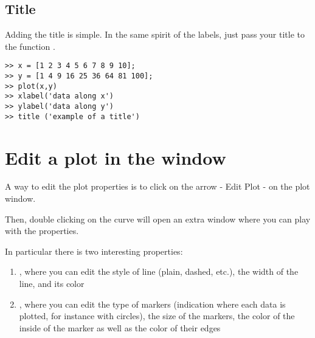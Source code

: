 
\subsection{Title}


Adding the title is simple.
In the same spirit of the labels, just pass your title to the function .

\begin{lstlisting}
>> x = [1 2 3 4 5 6 7 8 9 10];
>> y = [1 4 9 16 25 36 64 81 100];
>> plot(x,y)
>> xlabel('data along x')
>> ylabel('data along y')
>> title ('example of a title')
\end{lstlisting}





\section{Edit a plot in the window}

A way to edit the plot properties is to click on the arrow - Edit Plot - on the plot window.

Then, double clicking on the curve will open an extra window where you can play with the properties.

In particular there is two interesting properties:
\begin{enumerate}
	\item {}, where you can edit the style of line (plain, dashed, etc.), the width of the line, and its color
	\item {}, where you can edit the type of markers (indication where each data is plotted, for instance with circles), the size of the markers, the color of the inside of the marker as well as the color of their edges
\end{enumerate}



